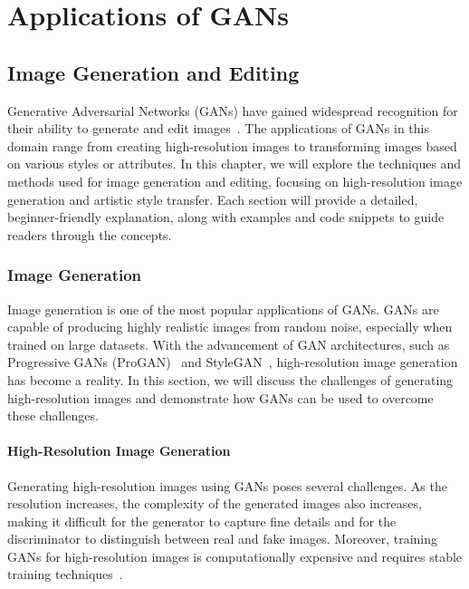 \part{Applications of GANs}

\chapter{Image Generation and Editing}
Generative Adversarial Networks (GANs) have gained widespread recognition for their ability to generate and edit images~\cite{goodfellow2014generative, wang2015deep, li2020gan, wang2022unrolled}. The applications of GANs in this domain range from creating high-resolution images to transforming images based on various styles or attributes. In this chapter, we will explore the techniques and methods used for image generation and editing, focusing on high-resolution image generation and artistic style transfer. Each section will provide a detailed, beginner-friendly explanation, along with examples and code snippets to guide readers through the concepts.

\section{Image Generation}
Image generation is one of the most popular applications of GANs. GANs are capable of producing highly realistic images from random noise, especially when trained on large datasets. With the advancement of GAN architectures, such as Progressive GANs (ProGAN)~\cite{he2018probgan} and StyleGAN~\cite{karras2019style}, high-resolution image generation has become a reality. In this section, we will discuss the challenges of generating high-resolution images and demonstrate how GANs can be used to overcome these challenges.

\subsection{High-Resolution Image Generation}
Generating high-resolution images using GANs poses several challenges. As the resolution increases, the complexity of the generated images also increases, making it difficult for the generator to capture fine details and for the discriminator to distinguish between real and fake images. Moreover, training GANs for high-resolution images is computationally expensive and requires stable training techniques~\cite{wang2018esrgan}.


